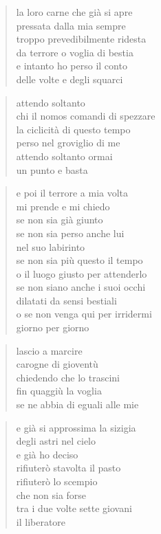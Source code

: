 	\begin{verse}
		la loro carne che già si apre\\
		pressata dalla mia sempre\\
		troppo prevedibilmente ridesta\\
		da terrore o voglia di bestia\\
		e intanto ho perso il conto\\
		delle volte e degli squarci
	\end{verse}

	\begin{verse}
		attendo soltanto\\
		chi il nomos comandi di spezzare\\
		la ciclicità di questo tempo\\
		perso nel groviglio di me\\
		attendo soltanto ormai\\
		un punto e basta
	\end{verse}

	\begin{verse}
		e poi il terrore a mia volta\\
		mi prende e mi chiedo\\
		se non sia già giunto\\
		se non sia perso anche lui\\
		nel suo labirinto\\
		se non sia più questo il tempo\\
		o il luogo giusto per attenderlo\\
		se non siano anche i suoi occhi\\
		dilatati da sensi bestiali\\
		o se non venga qui per irridermi\\
		giorno per giorno
	\end{verse}

	\begin{verse}
		lascio a marcire\\
		carogne di gioventù\\
		chiedendo che lo trascini\\
		fin quaggiù la voglia\\
		se ne abbia di eguali alle mie
	\end{verse}

	\begin{verse}
		e già si approssima la sizigia\\
		degli astri nel cielo\\
		e già ho deciso\\
		rifiuterò stavolta il pasto\\
		rifiuterò lo scempio\\
		che non sia forse\\
		tra i due volte sette giovani\\
		il liberatore
	\end{verse}

